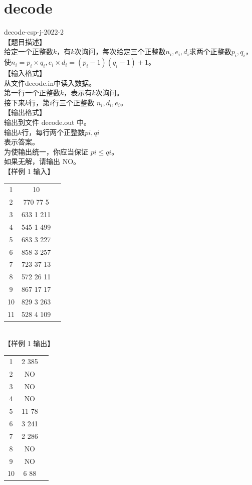 \documentclass[12pt,twiside,a4paper]{ctexbook}
\numberwithin{chapter}{part}
\begin{document}
\section{decode}
decode-csp-j-2022-2\\
【题目描述】\\
给定一个正整数$k$，有$k$次询问，每次给定三个正整数$n_i, e_i, d_i$求两个正整数$p_i
, q_i$，使$n_i = p_i \times q_i, e_i \times d_i = (p_i − 1)(q_i − 1) + 1$。\\
【输入格式】\\
从文件decode.in中读入数据。\\
第一行一个正整数$k$，表示有$k$次询问。\\
接下来$k$行，第$i$行三个正整数 $n_i, d_i, e_i$。\\
【输出格式】\\
输出到文件 decode.out 中。\\
输出$k$行，每行两个正整数$pi,qi$\\表示答案。\\
为使输出统一，你应当保证 $pi \leq qi$。\\
如果无解，请输出 NO。\\
【样例 1 输入】\\
\begin{tabular}{|c|c|c|}
  \hline
  1 & 10 \\
  2 & 770 77 5 \\
  3 & 633 1 211 \\
  4 & 545 1 499 \\
  5 & 683 3 227\\
  6 & 858 3 257\\
  7 & 723 37 13\\
  8 & 572 26 11\\
  9 & 867 17 17\\
  10 & 829 3 263\\
  11 & 528 4 109\\
  \hline
\end{tabular}\\
【样例 1 输出】\\
\begin{tabular}{|c|c|c|}
  \hline
  1 & 2 385 \\
  2 & NO \\
  3 & NO \\
  4 & NO \\
  5 & 11 78\\
  6 & 3 241\\
  7 & 2 286\\
  8 & NO\\
  9 & NO\\
  10 & 6 88\\
  \hline
\end{tabular}\\
\end{document}
